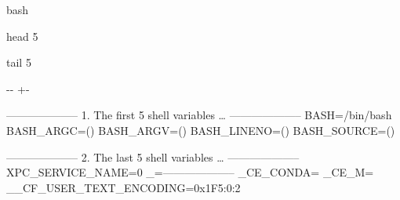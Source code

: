 \documentclass[letterpaper,10pt,english]{sphinxmanual}
\newlength\nbsphinxcodecellspacing
\begin{document}
{
\begin{sphinxVerbatim}[commandchars=\\\{\}]
\llap{\color{nbsphinxin}[5]:\,\hspace{\fboxrule}\hspace{\fboxsep}}\PYGZpc{}\PYGZpc{}bash

 
 
 
  head \PYGZhy{}5

 
 
 
  tail \PYGZhy{}5
\end{sphinxVerbatim}
}

{

\kern-\sphinxverbatimsmallskipamount\kern-\baselineskip
\kern+\FrameHeightAdjust\kern-\fboxrule
\vspace{\nbsphinxcodecellspacing}

\begin{sphinxVerbatim}[commandchars=\\\{\}]
--------------------
1. The first 5 shell variables {\ldots}
--------------------
BASH=/bin/bash
BASH\_ARGC=()
BASH\_ARGV=()
BASH\_LINENO=()
BASH\_SOURCE=()

--------------------
2. The last 5 shell variables {\ldots}
--------------------
XPC\_SERVICE\_NAME=0
\_=--------------------
\_CE\_CONDA=
\_CE\_M=
\_\_CF\_USER\_TEXT\_ENCODING=0x1F5:0:2
\end{sphinxVerbatim}
}
\end{document}
